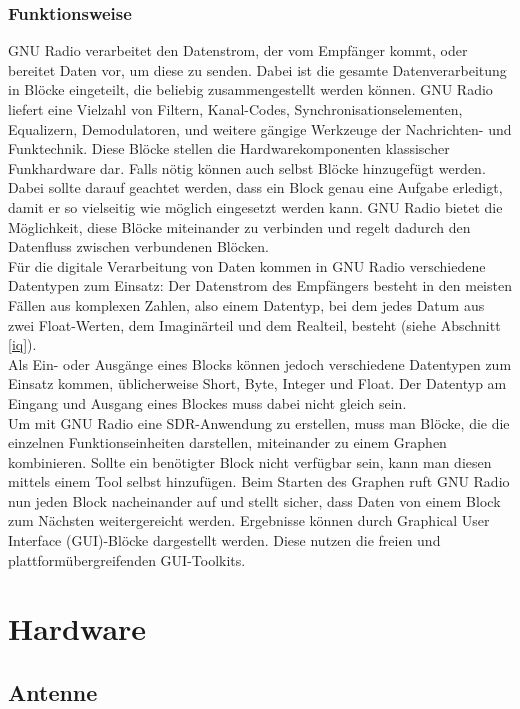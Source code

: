 \subsubsection{Funktionsweise}
GNU Radio verarbeitet den Datenstrom, der vom Empfänger kommt, oder bereitet Daten vor, um diese zu senden. Dabei ist die gesamte Datenverarbeitung in Blöcke eingeteilt, die  beliebig  zusammengestellt  werden können. GNU Radio liefert eine Vielzahl von Filtern, Kanal-Codes, Synchronisationselementen, Equalizern, Demodulatoren, und weitere gängige Werkzeuge der Nachrichten- und Funktechnik. Diese Blöcke stellen die Hardwarekomponenten klassischer Funkhardware dar. Falls nötig können auch selbst Blöcke hinzugefügt werden. Dabei sollte darauf geachtet werden, dass ein Block genau eine Aufgabe erledigt, damit er so vielseitig wie möglich eingesetzt werden kann. GNU Radio bietet die Möglichkeit, diese Blöcke miteinander zu verbinden und regelt dadurch den Datenfluss zwischen verbundenen Blöcken. \\

Für die digitale Verarbeitung von Daten kommen in GNU Radio verschiedene Datentypen zum Einsatz: Der Datenstrom des Empfängers besteht in den meisten Fällen aus komplexen Zahlen, also einem Datentyp, bei dem jedes Datum aus zwei Float-Werten, dem Imaginärteil und dem Realteil, besteht (siehe Abschnitt \ref{iq}). \\
Als Ein- oder Ausgänge eines Blocks können jedoch verschiedene Datentypen zum Einsatz kommen, üblicherweise Short, Byte, Integer und Float. Der Datentyp am Eingang und Ausgang eines Blockes muss dabei nicht gleich sein.\\

Um mit GNU Radio eine SDR-Anwendung zu erstellen, muss man Blöcke, die die einzelnen Funktionseinheiten darstellen, miteinander zu einem Graphen kombinieren. Sollte ein benötigter Block nicht verfügbar sein, kann man diesen mittels einem Tool selbst hinzufügen. Beim Starten des Graphen ruft GNU Radio nun jeden Block nacheinander auf und stellt sicher, dass Daten von einem Block zum Nächsten weitergereicht werden. Ergebnisse  können  durch  Graphical  User  Interface  (GUI)-Blöcke dargestellt werden. Diese nutzen die freien und plattformübergreifenden GUI-Toolkits.


\section{Hardware}

\subsection{Antenne} 

